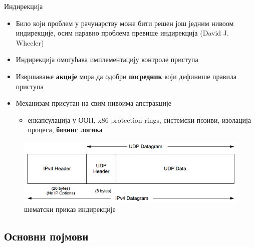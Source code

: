 \documentclass{beamer}
\begin{document}
    \begin{frame}[allowframebreaks]{Индирекција}
        \begin{itemize}
            \item Било који проблем у рачунарству може бити решен још једним нивоом индирекције, осим наравно проблема превише индирекција (David J. Wheeler)
            \item Индирекција омогућава имплементацију контроле приступа
            \item Извршавање \textbf{акције} мора да одобри \textbf{посредник} који дефинише правила приступа
            \item Механизам присутан на свим нивоима апстракције
            \begin{itemize}
                \item енкапсулација у ООП, x86 protection rings, системски позиви, изолација процеса, \textbf{бизнис логика}
            \end{itemize}
        \end{itemize}
        
        \framebreak
        
        \begin{figure}
            \centering
            \includegraphics[width=\textwidth,height=\textheight,keepaspectratio]{images/udp_enc.png}
            \caption{шематски приказ индирекције}
            \label{fig:udp_enc}
        \end{figure}
    \end{frame}
    
    \subsection{Основни појмови}
    
\end{document}

